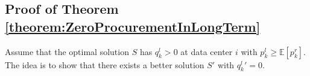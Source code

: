 




\subsection{Proof of Theorem \ref{theorem:ZeroProcurementInLongTerm}}
\label{proof:ZeroProcurementInLongTerm}

Assume that the optimal solution $S$ has $q^{l}_k > 0$ at data center $i$ with $p^l_k \geq \mathbb{E}[p^r_k]$. The idea is to show that there exists a better solution $S'$ with $q^{l}_k{'} = 0$. 

